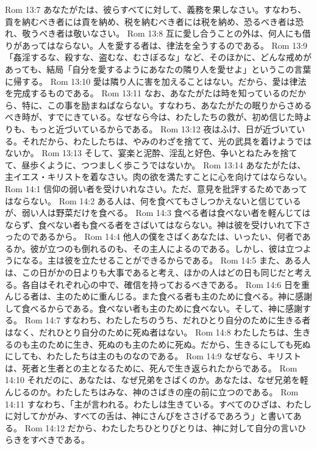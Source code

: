 Rom 13:7  あなたがたは、彼らすべてに対して、義務を果しなさい。すなわち、貢を納むべき者には貢を納め、税を納むべき者には税を納め、恐るべき者は恐れ、敬うべき者は敬いなさい。
Rom 13:8  互に愛し合うことの外は、何人にも借りがあってはならない。人を愛する者は、律法を全うするのである。
Rom 13:9  「姦淫するな、殺すな、盗むな、むさぼるな」など、そのほかに、どんな戒めがあっても、結局「自分を愛するようにあなたの隣り人を愛せよ」というこの言葉に帰する。
Rom 13:10  愛は隣り人に害を加えることはない。だから、愛は律法を完成するものである。
Rom 13:11  なお、あなたがたは時を知っているのだから、特に、この事を励まねばならない。すなわち、あなたがたの眠りからさめるべき時が、すでにきている。なぜなら今は、わたしたちの救が、初め信じた時よりも、もっと近づいているからである。
Rom 13:12  夜はふけ、日が近づいている。それだから、わたしたちは、やみのわざを捨てて、光の武具を着けようではないか。
Rom 13:13  そして、宴楽と泥酔、淫乱と好色、争いとねたみを捨てて、昼歩くように、つつましく歩こうではないか。
Rom 13:14  あなたがたは、主イエス・キリストを着なさい。肉の欲を満たすことに心を向けてはならない。
Rom 14:1  信仰の弱い者を受けいれなさい。ただ、意見を批評するためであってはならない。
Rom 14:2  ある人は、何を食べてもさしつかえないと信じているが、弱い人は野菜だけを食べる。
Rom 14:3  食べる者は食べない者を軽んじてはならず、食べない者も食べる者をさばいてはならない。神は彼を受けいれて下さったのであるから。
Rom 14:4  他人の僕をさばくあなたは、いったい、何者であるか。彼が立つのも倒れるのも、その主人によるのである。しかし、彼は立つようになる。主は彼を立たせることができるからである。
Rom 14:5  また、ある人は、この日がかの日よりも大事であると考え、ほかの人はどの日も同じだと考える。各自はそれぞれ心の中で、確信を持っておるべきである。
Rom 14:6  日を重んじる者は、主のために重んじる。また食べる者も主のために食べる。神に感謝して食べるからである。食べない者も主のために食べない。そして、神に感謝する。
Rom 14:7  すなわち、わたしたちのうち、だれひとり自分のために生きる者はなく、だれひとり自分のために死ぬ者はない。
Rom 14:8  わたしたちは、生きるのも主のために生き、死ぬのも主のために死ぬ。だから、生きるにしても死ぬにしても、わたしたちは主のものなのである。
Rom 14:9  なぜなら、キリストは、死者と生者との主となるために、死んで生き返られたからである。
Rom 14:10  それだのに、あなたは、なぜ兄弟をさばくのか。あなたは、なぜ兄弟を軽んじるのか。わたしたちはみな、神のさばきの座の前に立つのである。
Rom 14:11  すなわち、「主が言われる。わたしは生きている。すべてのひざは、わたしに対してかがみ、すべての舌は、神にさんびをささげるであろう」と書いてある。
Rom 14:12  だから、わたしたちひとりびとりは、神に対して自分の言いひらきをすべきである。
